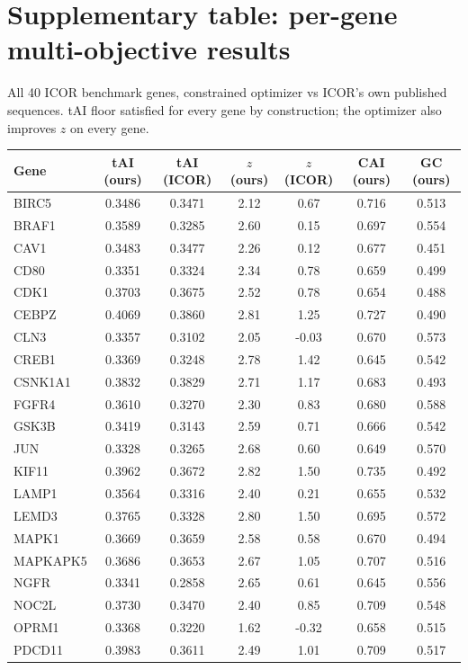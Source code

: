\section{Supplementary table: per-gene multi-objective results}
All 40 ICOR benchmark genes, constrained optimizer vs ICOR's own published sequences. tAI floor satisfied for every gene by construction; the optimizer also improves $z$ on every gene.
\begin{center}\small
\begin{tabular}{lcccccc}\hline\hline
Gene & tAI (ours) & tAI (ICOR) & $z$ (ours) & $z$ (ICOR) & CAI (ours) & GC (ours)\\\hline
BIRC5 & 0.3486 & 0.3471 & 2.12 & 0.67 & 0.716 & 0.513\\
BRAF1 & 0.3589 & 0.3285 & 2.60 & 0.15 & 0.697 & 0.554\\
CAV1 & 0.3483 & 0.3477 & 2.26 & 0.12 & 0.677 & 0.451\\
CD80 & 0.3351 & 0.3324 & 2.34 & 0.78 & 0.659 & 0.499\\
CDK1 & 0.3703 & 0.3675 & 2.52 & 0.78 & 0.654 & 0.488\\
CEBPZ & 0.4069 & 0.3860 & 2.81 & 1.25 & 0.727 & 0.490\\
CLN3 & 0.3357 & 0.3102 & 2.05 & -0.03 & 0.670 & 0.573\\
CREB1 & 0.3369 & 0.3248 & 2.78 & 1.42 & 0.645 & 0.542\\
CSNK1A1 & 0.3832 & 0.3829 & 2.71 & 1.17 & 0.683 & 0.493\\
FGFR4 & 0.3610 & 0.3270 & 2.30 & 0.83 & 0.680 & 0.588\\
GSK3B & 0.3419 & 0.3143 & 2.59 & 0.71 & 0.666 & 0.542\\
JUN & 0.3328 & 0.3265 & 2.68 & 0.60 & 0.649 & 0.570\\
KIF11 & 0.3962 & 0.3672 & 2.82 & 1.50 & 0.735 & 0.492\\
LAMP1 & 0.3564 & 0.3316 & 2.40 & 0.21 & 0.655 & 0.532\\
LEMD3 & 0.3765 & 0.3328 & 2.80 & 1.50 & 0.695 & 0.572\\
MAPK1 & 0.3669 & 0.3659 & 2.58 & 0.58 & 0.670 & 0.494\\
MAPKAPK5 & 0.3686 & 0.3653 & 2.67 & 1.05 & 0.707 & 0.516\\
NGFR & 0.3341 & 0.2858 & 2.65 & 0.61 & 0.645 & 0.556\\
NOC2L & 0.3730 & 0.3470 & 2.40 & 0.85 & 0.709 & 0.548\\
OPRM1 & 0.3368 & 0.3220 & 1.62 & -0.32 & 0.658 & 0.515\\
PDCD11 & 0.3983 & 0.3611 & 2.49 & 1.01 & 0.709 & 0.517\\

\end{tabular}
\end{center}
